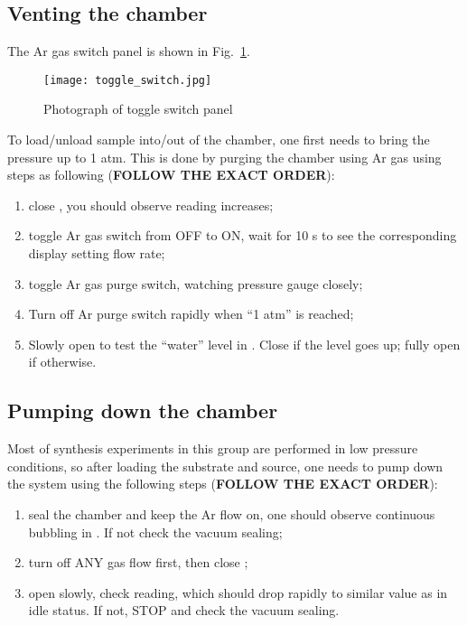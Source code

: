\subsection{Venting the chamber}
The Ar gas switch panel is shown in Fig.~\ref{fig:switch}. 
\begin{figure}[htb]
\centering
\texttt{[image: toggle\_switch.jpg]}
\caption{Photograph of toggle switch panel}
\label{fig:switch}
\end{figure}
To load/unload sample into/out of the chamber, one first needs to bring the pressure up to 1 atm. This is done by purging the chamber using Ar gas using steps as following (\textbf{FOLLOW THE EXACT ORDER}):
\begin{enumerate}
\item close , you should observe  reading increases;
\item toggle Ar gas switch from OFF to ON, wait for 10 s to see the corresponding  display setting flow rate;
\item toggle Ar gas purge switch, watching pressure gauge  closely; 
\item Turn off Ar purge switch rapidly when ``1 atm'' is reached; 
\item Slowly open  to test the ``water'' level in . Close  if the level goes up; fully open  if otherwise. 
\end{enumerate}

\subsection{Pumping down the chamber}
Most of synthesis experiments in this group are performed in low pressure conditions, so after loading the substrate and source, one needs to pump down the system using the following steps (\textbf{FOLLOW THE EXACT ORDER}):
\begin{enumerate}
\item seal the chamber and keep the Ar flow on, one should observe continuous bubbling in . If not check the vacuum sealing;
\item turn off ANY gas flow first, then close ;
\item open  slowly, check  reading, which should drop rapidly to similar value as in idle status. If not, STOP and check the vacuum sealing.  
\end{enumerate}

